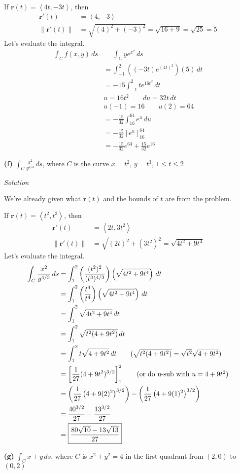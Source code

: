 \documentclass{article}
\newcommand{\lrp}[1]{\left( #1 \right)}
\newcommand{\lra}[1]{\left\langle #1 \right\rangle}
\newcommand{\lrb}[1]{\left[ #1 \right]}
\newcommand{\norm}[1]{\left\lVert #1 \right\rVert}
\renewcommand{\r}[0]{\mathbf{r}}
\newcommand{\Solution}{\textit{Solution}}
\begin{document}
If $\r(t)=\lra{4t,-3t}$, then
\begin{align*}
    \r'(t)&=\lra{4,-3}\\
    \norm{\r'(t)}&=\sqrt{(4)^2+(-3)^2}=\sqrt{16+9}=\sqrt{25}=5
\end{align*}
Let's evaluate the integral.
\begin{align*}
    \int_C f(x,y)\,ds&=\int_C ye^{x^2}\,ds\\
    &=\int_{-1}^2 \lrp{(-3t)e^{(4t)^2}}(5)\,dt\\
    &=-15\int_{-1}^2 te^{16t^2}\,dt\tag{we can move constants outside}\\
    &u=16t^2\hspace{2em}du=32t\,dt\\
    &u(-1)=16\hspace{2em}u(2)=64\\
    &=-\frac{15}{32}\int_{16}^{64}e^u\,du\\
    &=-\frac{15}{32}\lrb{e^u}_{16}^{64}\\
    &=\boxed{-\frac{15}{32}e^{64}+\frac{15}{32}e^{16}}
\end{align*}
{}\textbf{(f)} $\displaystyle \int_C \frac{x^2}{y^{4/3}}\,ds$, where $C$ is the curve $x=t^2$, $y=t^3$, $1\leq t \leq 2$

\Solution

We're already given what $\r(t)$ and the bounds of $t$ are from the problem.

If $\r(t)=\lra{t^2,t^3}$, then
\begin{align*}
    \r'(t)&=\lra{2t,3t^2}\\
    \norm{\r'(t)}&=\sqrt{(2t)^2+(3t^2)^2}=\sqrt{4t^2+9t^4}
\end{align*}
Let's evaluate the integral.
\begin{align*}
    \int_C \frac{x^2}{y^{4/3}}\,ds&=\int_1^2 \lrp{\frac{(t^2)^2}{(t^3)^{4/3}}}\lrp{\sqrt{4t^2+9t^4}}\,dt\\
    &=\int_1^2 \lrp{\frac{t^4}{t^4}}\lrp{\sqrt{4t^2+9t^4}}\,dt\\
    &=\int_1^2 \sqrt{4t^2+9t^4}\,dt\\
    &=\int_1^2\sqrt{t^2(4+9t^2)}\,dt\\
    &=\int_1^2 t\sqrt{4+9t^2}\,dt\tag{$\sqrt{t^2(4+9t^2)}=\sqrt{t^2}\sqrt{4+9t^2}$}\\
    &=\lrb{\frac{1}{27}(4+9t^2)^{3/2}}_1^2\tag{or do u-sub with $u=4+9t^2$}\\
    &=\lrp{\frac{1}{27}\lrp{4+9(2)^2}^{3/2}}-\lrp{\frac{1}{27}\lrp{4+9(1)^2}^{3/2}}\\
    &=\frac{40^{3/2}}{27}-\frac{13^{3/2}}{27}\\
    &=\boxed{\frac{80\sqrt{10}-13\sqrt{13}}{27}}
\end{align*}
{}\textbf{(g)} $\displaystyle \int_C x+y\,ds$, where $C$ is $x^2+y^2=4$ in the first quadrant from $(2,0)$ to $(0,2)$
\end{document}
